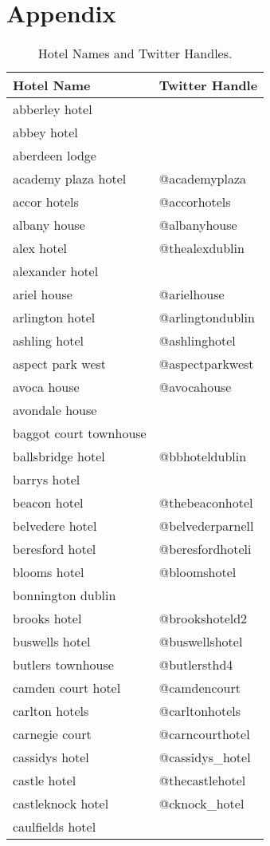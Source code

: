\chapter{Appendix}

\begin{table}[h!]
\caption{Hotel Names and Twitter Handles.}
\label{Table:hotels}
\begin{tabular}{|p{7cm}|p{5cm}|}
\hline
\textbf{Hotel Name} & \textbf{Twitter Handle} \\ \hline
abberley hotel &  \\ \hline
abbey hotel &  \\ \hline
aberdeen lodge &  \\ \hline
academy plaza hotel & @academyplaza \\ \hline
accor hotels & @accorhotels \\ \hline
albany house & @albanyhouse \\ \hline
alex hotel & @thealexdublin \\ \hline
alexander hotel &  \\ \hline
ariel house & @arielhouse \\ \hline
arlington hotel & @arlingtondublin \\ \hline
ashling hotel & @ashlinghotel \\ \hline
aspect park west & @aspectparkwest \\ \hline
avoca house & @avocahouse \\ \hline
avondale house &  \\ \hline
baggot court townhouse &  \\ \hline
ballsbridge hotel & @bbhoteldublin \\ \hline
barrys hotel &  \\ \hline
beacon hotel & @thebeaconhotel \\ \hline
belvedere hotel & @belvederparnell \\ \hline
beresford hotel & @beresfordhoteli \\ \hline
blooms hotel & @bloomshotel \\ \hline
bonnington dublin &  \\ \hline
brooks hotel & @brookshoteld2 \\ \hline
buswells hotel & @buswellshotel \\ \hline
butlers townhouse & @butlersthd4 \\ \hline
camden court hotel & @camdencourt \\ \hline
carlton hotels & @carltonhotels \\ \hline
carnegie court & @carncourthotel \\ \hline
cassidys hotel & @cassidys\_hotel \\ \hline
castle hotel & @thecastlehotel \\ \hline
castleknock hotel & @cknock\_hotel \\ \hline
caulfields hotel &  \\ \hline
\end{tabular}
\end{table}


